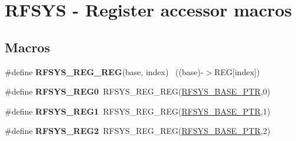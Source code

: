 \hypertarget{group___r_f_s_y_s___register___accessor___macros}{}\section{R\+F\+S\+Y\+S -\/ Register accessor macros}
\label{group___r_f_s_y_s___register___accessor___macros}
\subsection*{Macros}
\begin{DoxyCompactItemize}
\item 
\hypertarget{group___r_f_s_y_s___register___accessor___macros_ga95bd4c5a762f7e08df15fc92a585f926}{}\#define {\bfseries R\+F\+S\+Y\+S\+\_\+\+R\+E\+G\+\_\+\+R\+E\+G}(base,  index)                            ~((base)-\/$>$R\+E\+G\mbox{[}index\mbox{]})\label{group___r_f_s_y_s___register___accessor___macros_ga95bd4c5a762f7e08df15fc92a585f926}

\item 
\hypertarget{group___r_f_s_y_s___register___accessor___macros_gac8659efbc5335c7c55ce700f560e641f}{}\#define {\bfseries R\+F\+S\+Y\+S\+\_\+\+R\+E\+G0}~R\+F\+S\+Y\+S\+\_\+\+R\+E\+G\+\_\+\+R\+E\+G(\hyperlink{group___r_f_s_y_s___peripheral_ga2dab66eae1abcaf22879dbce661ea2fa}{R\+F\+S\+Y\+S\+\_\+\+B\+A\+S\+E\+\_\+\+P\+T\+R},0)\label{group___r_f_s_y_s___register___accessor___macros_gac8659efbc5335c7c55ce700f560e641f}

\item 
\hypertarget{group___r_f_s_y_s___register___accessor___macros_ga20ef6da127caf2238db5623847eb2ada}{}\#define {\bfseries R\+F\+S\+Y\+S\+\_\+\+R\+E\+G1}~R\+F\+S\+Y\+S\+\_\+\+R\+E\+G\+\_\+\+R\+E\+G(\hyperlink{group___r_f_s_y_s___peripheral_ga2dab66eae1abcaf22879dbce661ea2fa}{R\+F\+S\+Y\+S\+\_\+\+B\+A\+S\+E\+\_\+\+P\+T\+R},1)\label{group___r_f_s_y_s___register___accessor___macros_ga20ef6da127caf2238db5623847eb2ada}

\item 
\hypertarget{group___r_f_s_y_s___register___accessor___macros_gaae849d61adc6c407683197d3dd93e2b8}{}\#define {\bfseries R\+F\+S\+Y\+S\+\_\+\+R\+E\+G2}~R\+F\+S\+Y\+S\+\_\+\+R\+E\+G\+\_\+\+R\+E\+G(\hyperlink{group___r_f_s_y_s___peripheral_ga2dab66eae1abcaf22879dbce661ea2fa}{R\+F\+S\+Y\+S\+\_\+\+B\+A\+S\+E\+\_\+\+P\+T\+R},2)\label{group___r_f_s_y_s___register___accessor___macros_gaae849d61adc6c407683197d3dd93e2b8}


\end{DoxyCompactItemize}
